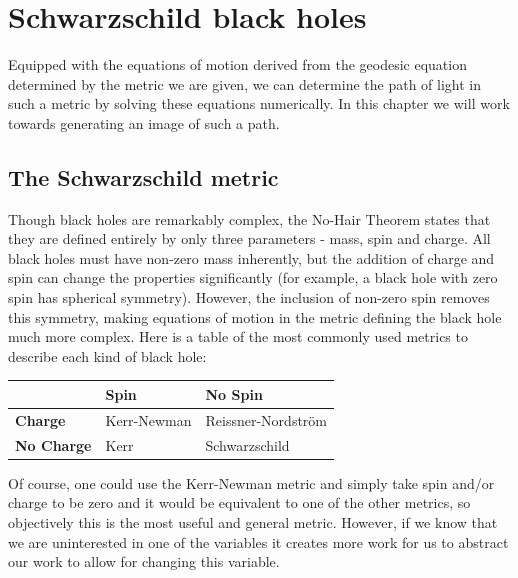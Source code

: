 \documentclass[oneside,openright,frontopenright, singlespacing]{dmathesis}
\begin{document}
\chapter{Schwarzschild black holes}\label{chap:Chapter3}

	Equipped with the equations of motion derived from the geodesic equation determined by the metric we are given, we can determine the path of light in such a metric by solving these equations numerically. In this chapter we will work towards generating an image of such a path.

\section{The Schwarzschild metric}\label{sec:Section3.1}

	Though black holes are remarkably complex, the No-Hair Theorem states that they are defined entirely by only three parameters - mass, spin and charge. All black holes must have non-zero mass inherently, but the addition of charge and spin can change the properties significantly (for example, a black hole with zero spin has spherical symmetry). However, the inclusion of non-zero spin removes this symmetry, making equations of motion in the metric defining the black hole much more complex. Here is a table of the most commonly used metrics to describe each kind of black hole:

\vspace{1em}
\begin{center}
	\begin{tabular}{l l l}
		\toprule
		\textbf{ } & \textbf{Spin} & \textbf{No Spin}\\
		\midrule
		\textbf{Charge} & Kerr-Newman & Reissner-Nordström \\
		\midrule
		\textbf{No Charge} & Kerr & Schwarzschild \\
		\bottomrule
	\end{tabular}
\end{center}

\vspace{1em}
	Of course, one could use the Kerr-Newman metric and simply take spin and/or charge to be zero and it would be equivalent to one of the other metrics, so objectively this is the most useful and general metric. However, if we know that we are uninterested in one of the variables it creates more work for us to abstract our work to allow for changing this variable.
\end{document}
